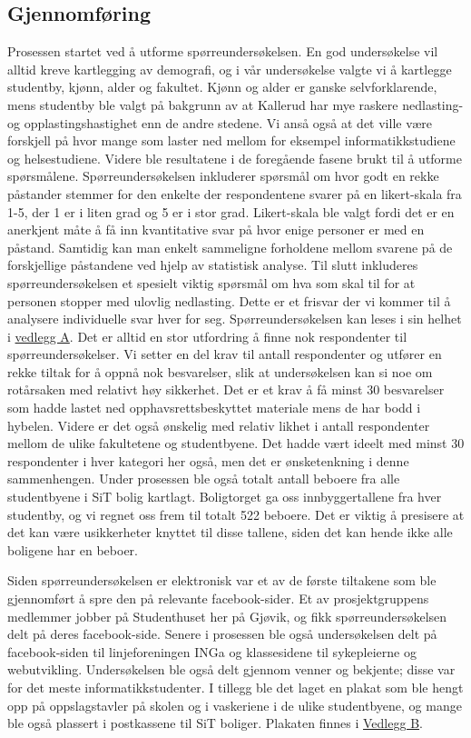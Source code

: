 \subsection{Gjennomføring}
Prosessen startet ved å utforme spørreundersøkelsen. En god undersøkelse vil alltid kreve kartlegging av demografi, og i vår undersøkelse valgte vi å kartlegge studentby, kjønn, alder og fakultet. Kjønn og alder er ganske selvforklarende, mens studentby ble valgt på bakgrunn av at Kallerud har mye raskere nedlasting- og opplastingshastighet enn de andre stedene. Vi anså også at det ville være forskjell på hvor mange som laster ned mellom for eksempel informatikkstudiene og helsestudiene. Videre ble resultatene i de foregående fasene brukt til å utforme spørsmålene. Spørreundersøkelsen inkluderer spørsmål om hvor godt en rekke påstander stemmer for den enkelte der respondentene svarer på en likert-skala fra 1-5, der 1 er i liten grad og 5 er i stor grad. Likert-skala ble valgt fordi det er en anerkjent måte å få inn kvantitative svar på hvor enige personer er med en påstand. Samtidig kan man enkelt sammeligne forholdene mellom svarene på de forskjellige påstandene ved hjelp av statistisk analyse. Til slutt inkluderes spørreundersøkelsen et spesielt viktig spørsmål om hva som skal til for at personen stopper med ulovlig nedlasting. Dette er et frisvar der vi kommer til å analysere individuelle svar hver for seg. Spørreundersøkelsen kan leses i sin helhet i \hyperref[undersokelse]{vedlegg A}.
\newline
Det er alltid en stor utfordring å finne nok respondenter til spørreundersøkelser. Vi setter en del krav til antall respondenter og utfører en rekke tiltak for å oppnå nok besvarelser, slik at undersøkelsen kan si noe om rotårsaken med relativt høy sikkerhet. Det er et krav å få minst 30 besvarelser som hadde lastet ned opphavsrettsbeskyttet materiale mens de har bodd i hybelen. Videre er det også ønskelig med relativ likhet i antall respondenter mellom de ulike fakultetene og studentbyene. Det hadde vært ideelt med minst 30 respondenter i hver kategori her også, men det er ønsketenkning i denne sammenhengen. Under prosessen ble også totalt antall beboere fra alle studentbyene i SiT bolig kartlagt. Boligtorget ga oss innbyggertallene fra hver studentby, og vi regnet oss frem til totalt 522 beboere. Det er viktig å presisere at det kan være usikkerheter knyttet til disse tallene, siden det kan hende ikke alle boligene har en beboer.

Siden spørreundersøkelsen er elektronisk var et av de første tiltakene som ble gjennomført å spre den på relevante facebook-sider. Et av prosjektgruppens medlemmer jobber på Studenthuset her på Gjøvik, og fikk spørreundersøkelsen delt på deres facebook-side. Senere i prosessen ble også undersøkelsen delt på facebook-siden til linjeforeningen INGa og klassesidene til sykepleierne og webutvikling. Undersøkelsen ble også delt gjennom venner og bekjente; disse var for det meste informatikkstudenter. I tillegg ble det laget en plakat som ble hengt opp på oppslagstavler på skolen og i vaskeriene i de ulike studentbyene, og mange ble også plassert i postkassene til SiT boliger. Plakaten finnes i \hyperref[plakat]{Vedlegg B}. 

